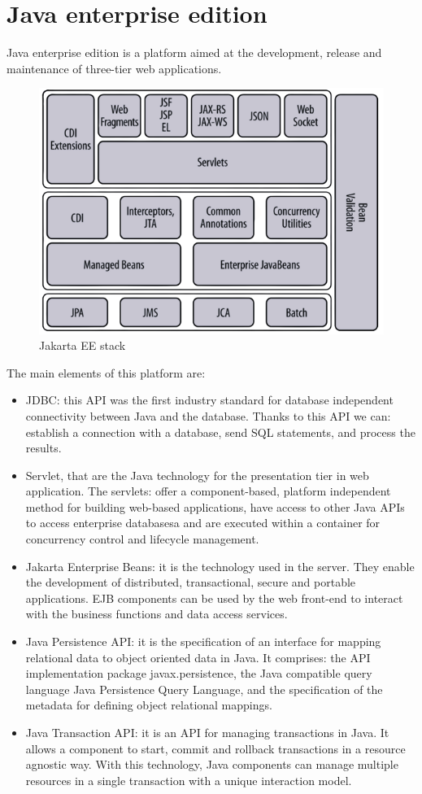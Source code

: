 \section{Java enterprise edition}

Java enterprise edition is a platform aimed at the development, release and maintenance of three-tier web applications.
\begin{figure}[H]
    \centering
    \includegraphics[width=0.5\linewidth]{images/jee.png}
    \caption{Jakarta EE stack}
\end{figure}
The main elements of this platform are: 
\begin{itemize}
    \item JDBC: this API was the first industry standard for database independent connectivity between Java and the database. Thanks to this API we can:
        establish a connection with a database, send SQL statements, and process the results. 
    \item Servlet, that are the Java technology for the presentation tier in web application. The servlets: 
        offer a component-based, platform independent method for building web-based applications, have access to other Java APIs to access enterprise databasesa 
        and are executed within a container for concurrency control and lifecycle management. 
    \item Jakarta Enterprise Beans: it is the technology used in the server. They enable the development of distributed, transactional, secure and portable applications. 
        EJB components can be used by the web front-end to interact with the business functions and data access services. 
    \item Java Persistence API: it is the specification of an interface for mapping relational data to object oriented data in Java. 
        It comprises: the API implementation package javax.persistence, the Java compatible query language Java Persistence Query Language, and the specification of the metadata for defining object
        relational mappings. 
    \item Java Transaction API: it is an API for managing transactions in Java. It allows a component to start, commit and rollback transactions in a resource agnostic way. 
        With this technology, Java components can manage multiple resources in a single transaction with a unique interaction model.
\end{itemize}
